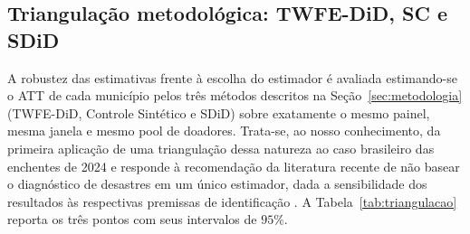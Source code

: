 \documentclass[a4paper,12pt]{article}
\begin{document}
\newpage
\subsection{Triangulação metodológica: TWFE-DiD, SC e SDiD}
\label{sub:triangulacao}

A robustez das estimativas frente à escolha do estimador é avaliada
estimando-se o ATT de cada município pelos três métodos descritos na
Seção~\ref{sec:metodologia} (TWFE-DiD, Controle Sintético e SDiD) sobre
exatamente o mesmo painel, mesma janela e mesmo pool de doadores. Trata-se,
ao nosso conhecimento, da primeira aplicação de uma triangulação dessa
natureza ao caso brasileiro das enchentes de 2024 e responde à recomendação
da literatura recente de não basear o diagnóstico de desastres em um único
estimador, dada a sensibilidade dos resultados às respectivas premissas de
identificação \cite{botzen2019, cavallo2013}. A
Tabela~\ref{tab:triangulacao} reporta os três pontos com seus intervalos de
$95\%$.
\end{document}
